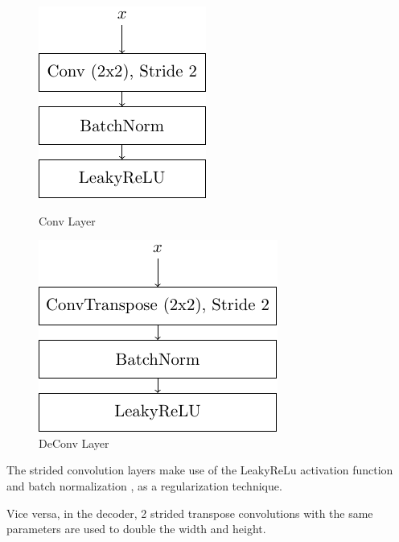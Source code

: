 \begin{figure}[h!]
    \centering
    \begin{minipage}[b]{0.45\textwidth}
        \centering
        \includegraphics[]{figures/model_architecture/build/conv_layer.pdf}
        \caption{Conv Layer}
    \end{minipage}
    \hfill
    \begin{minipage}[b]{0.45\textwidth}
        \centering
        \includegraphics[]{figures/model_architecture/build/deconv_layer.pdf}
        \caption{DeConv Layer}
    \end{minipage}
\end{figure}

The strided convolution layers make use of the LeakyReLu activation function and batch normalization \parencite{BatchNorm}, as a regularization technique.

Vice versa, in the decoder, 2 strided transpose convolutions with the same parameters are used to double the width and height.

